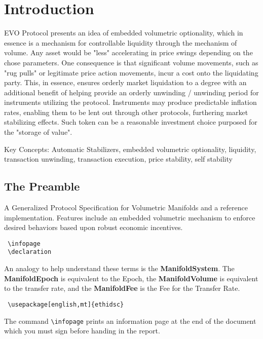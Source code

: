 \chapter{Introduction}\label{sec:introduction}

EVO Protocol presents an idea of embedded volumetric optionality, which in essence is a mechanism for controllable liquidity through the mechanism of volume. Any asset would be "less" accelerating in price swings depending on the chose parameters. One consequence is that significant volume movements, such as "rug pulls" or legitimate price action movements, incur a cost onto the liquidating party. This, in essence, ensures orderly market liquidation to a degree with an additional benefit of helping provide an orderly unwinding / unwinding period for instruments utilizing the protocol. Instruments may produce predictable inflation rates, enabling them to be lent out through other protocols, furthering market stabilizing effects. Such token can be a reasonable investment choice purposed for the "storage of value".

Key Concepts: Automatic Stabilizers, embedded volumetric optionality, liquidity, transaction unwinding, transaction execution, price stability, self stability

\section{The Preamble}\label{sec:preamble}
A Generalized Protocol Specification for Volumetric Manifolds and a reference implementation. Features include an embedded  volumetric mechanism to enforce desired behaviors based upon robust economic incentives.
\begin{verbatim}
 \infopage
 \declaration
\end{verbatim}

An analogy to help understand these terms is the \textbf{ManifoldSystem}. The \textbf{ManifoldEpoch} is equivalent to the Epoch, the \textbf{ManifoldVolume} is equivalent to the transfer rate, and the \textbf{ManifoldFee} is the Fee for the Transfer Rate. 


\begin{verbatim}
 \usepackage[english,mt]{ethidsc}
\end{verbatim}
The command \texttt{\textbackslash infopage} prints an information page at the end of the document which you must sign before handing in the report.
